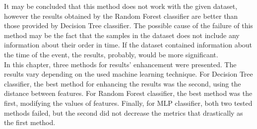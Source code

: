 It may be concluded that this method does not work with the given dataset, however the results obtained by the Random Forest classifier are better than those provided by Decision Tree classifier. The possible cause of the failure of this method may be the fact that the samples in the dataset does not include any information about their order in time. If the dataset contained information about the time of the event, the results, probably, would be more significant. \\

In this chapter, three methods for results' enhancement were presented. The results vary depending on the used machine learning technique. For Decision Tree classifier, the best method for enhancing the results was the second, using the distance between features. For Random Forest classifier, the best method was the first, modifying the values of features. Finally, for MLP classifier, both two tested methods failed, but the second did not decrease the metrics that drastically as the first method.